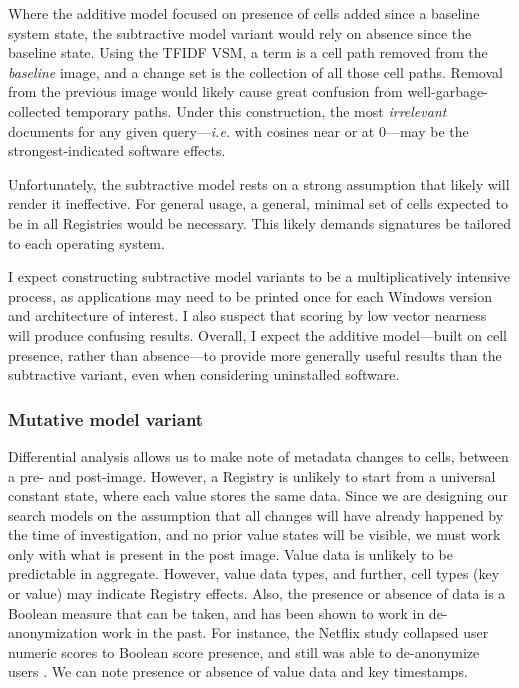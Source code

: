 \documentclass[11pt]{ucthesis}
\theoremstyle{plain}
\theoremstyle{definition}
\newcommand{\ie}{\emph{i.e.}\xspace}
\begin{document}
Where the additive model focused on presence of cells added since a baseline system state, the subtractive model variant would rely on absence since the baseline state.  Using the TFIDF VSM, a term is a cell path removed from the \emph{baseline} image, and a change set is the collection of all those cell paths.  Removal from the previous image would likely cause great confusion from well-garbage-collected temporary paths.  Under this construction, the most \emph{irrelevant} documents for any given query---\ie with cosines near or at 0---may be the strongest-indicated software effects.

Unfortunately, the subtractive model rests on a strong assumption that likely will render it ineffective.  For general usage, a general, minimal set of cells expected to be in all Registries would be necessary.  This likely demands signatures be tailored to each operating system.

I expect constructing subtractive model variants to be a multiplicatively intensive process, as applications may need to be printed once for each Windows version and architecture of interest.  I also suspect that scoring by low vector nearness will produce confusing results.  Overall, I expect the additive model---built on cell presence, rather than absence---to provide more generally useful results than the subtractive variant, even when considering uninstalled software.


\subsubsection{Mutative model variant}

Differential analysis allows us to make note of metadata changes to cells, between a pre- and post-image.  However, a Registry is unlikely to start from a universal constant state, where each value stores the same data.  Since we are designing our search models on the assumption that all changes will have already happened by the time of investigation, and no prior value states will be visible, we must work only with what is present in the post image.  Value data is unlikely to be predictable in aggregate.  However, value data types, and further, cell types (key or value) may indicate Registry effects.  Also, the presence or absence of data is a Boolean measure that can be taken, and has been shown to work in de-anonymization work in the past.  For instance, the Netflix study collapsed user numeric scores to Boolean score presence, and still was able to de-anonymize users \cite{narayanan:sp08}.  We can note presence or absence of value data and key timestamps.
\end{document}
